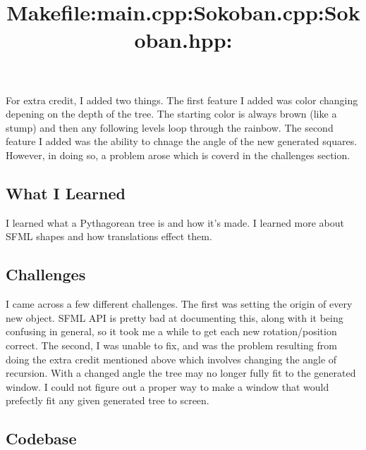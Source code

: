 \bigskip
For extra credit, I added two things.
The first feature I added was color changing depening on the depth of the tree.
The starting color is always brown (like a stump) and then any following levels loop through the rainbow.
The second feature I added was the ability to chnage the angle of the new generated squares.
However, in doing so, a problem arose which is coverd in the challenges section.

\subsection{What I Learned}\label{sec:ps3:learned} %

I learned what a Pythagorean tree is and how it's made.
I learned more about SFML shapes and how translations effect them.

\subsection{Challenges}\label{sec:ps3:challenges} %

I came across a few different challenges.
The first was setting the origin of every new object.
SFML API is pretty bad at documenting this, along with it being confusing in general, so it took me a while to get each new rotation/position correct.
The second, I was unable to fix, and was the problem resulting from doing the extra credit mentioned above which involves changing the angle of recursion.
With a changed angle the tree may no longer fully fit to the generated window.
I could not figure out a proper way to make a window that would prefectly fit any given generated tree to screen.

\newpage
\subsection{Codebase}\label{sec:ps3:code} %

\bigskip
\title{\large Makefile:}

\bigskip
\title{\large main.cpp:}

\bigskip
\title{\large Sokoban.cpp:}

\bigskip
\title{\large Sokoban.hpp:}


\newpage

